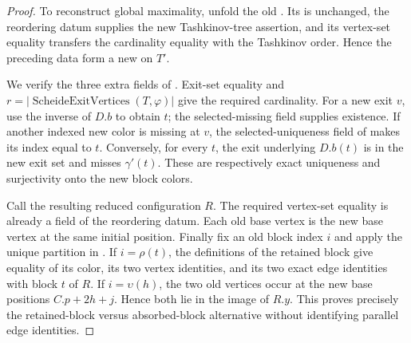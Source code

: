 \begin{proof}
To reconstruct global maximality, unfold the old
.  Its  is unchanged, the
reordering datum supplies the new Tashkinov-tree assertion, and its
vertex-set equality transfers the cardinality equality with the Tashkinov
order.  Hence the preceding data form a new
 on $T'$.

We verify the three extra fields of
.  Exit-set equality and
$r=|\operatorname{ScheideExitVertices}(T,\varphi)|$ give the required
cardinality.  For a new exit $v$, use the inverse of $D.b$ to obtain $t$;
the selected-missing field supplies existence.  If another indexed new
color is missing at $v$, the selected-uniqueness field of
 makes its index equal to $t$.
Conversely, for every $t$, the exit underlying $D.b(t)$ is in the new exit
set and misses $\gamma'(t)$.  These are respectively exact uniqueness and
surjectivity onto the new block colors.

Call the resulting reduced configuration $R$.  The required vertex-set
equality is already a field of the reordering datum.  Each old base vertex
is the new base vertex at the same initial position.  Finally fix an old
block index $i$ and apply the unique partition in
.  If $i=\rho(t)$, the definitions
of the retained block give equality of its color, its two vertex
identities, and its two exact edge identities with block $t$ of $R$.  If
$i=\upsilon(h)$, the two old vertices occur at the new base positions
$C.p+2h+j$.  Hence both lie in the image of $R.y$.  This proves precisely
the retained-block versus absorbed-block alternative without identifying
parallel edge identities.
\end{proof}

